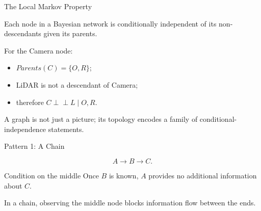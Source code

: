 \documentclass[aspectratio=169,10pt]{beamer}
\begin{document}
\begin{frame}[shrink=10]{The Local Markov Property}
  \begin{cpdefinition}
    Each node in a Bayesian network is conditionally independent of its non-descendants given its parents.
  \end{cpdefinition}

  For the Camera node:
  \begin{itemize}
    \item $Parents(C)=\{O,R\}$;
    \item LiDAR is not a descendant of Camera;
    \item therefore $C\perp\!\!\!\perp L\mid O,R$.
  \end{itemize}

  \begin{keyidea}
    A graph is not just a picture; its topology encodes a family of conditional-independence statements.
  \end{keyidea}
\end{frame}

\begin{frame}[shrink=10]{Pattern 1: A Chain}
  \begin{center}
  \end{center}

  \[
    A\rightarrow B\rightarrow C.
  \]

  \begin{block}{Condition on the middle}
    Once $B$ is known, $A$ provides no additional information about $C$.
  \end{block}

  \begin{keyidea}
    In a chain, observing the middle node blocks information flow between the ends.
  \end{keyidea}
\end{frame}
\end{document}
